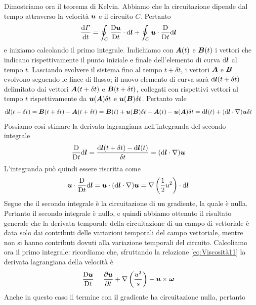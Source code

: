 Dimostriamo ora il teorema di Kelvin. Abbiamo che la circuitazione dipende dal tempo attraverso la velocità $\V{u}$ e il circuito $C$. Pertanto 
\begin{equation}
\der{\Gamma}{t} = \oint_C \derL{\V{u}}{t} \cdot \dd \V{l} + \oint_C \scal{u}{} \derL{}{t} \dd \V{l} \label{eq:Viscosità10}
\end{equation}
e iniziamo calcolando il primo integrale. Indichiamo con $\V{A}(t)$ e $\V{B}(t)$ i vettori che indicano rispettivamente il punto iniziale e finale dell'elemento di curva $\dd \V{l}$ al tempo $t$. Lasciando evolvere il sistema fino al tempo $t+\delta t$, i vettori $\V{A}$ e $\V{B}$ evolvono seguendo le linee di flusso; il nuovo elemento di curva sarà $\dd \V{l}(t+\delta t)$ delimitato dai vettori $\V{A}(t+\delta t)$ e $\V{B}(t+\delta t)$, collegati con rispettivi vettori al tempo $t$ rispettivamente da $\V{u}(\V{A)}\delta t$ e $\V{u}(\V{B})\delta t$. Pertanto vale
\begin{equation}
\dd \V{l} (t+\delta t) = \V{B}(t+\delta t)-\V{A}(t+\delta t) = \V{B}(t) + \V{u}(\V{B})\delta t - \V{A}(t) - \V{u}(\V{A})\delta t = \dd \V{l}(t) + (\dd \scal{l}{\nabla})\V{u} \delta t
\end{equation}
Possiamo così stimare la derivata lagrangiana nell'integranda del secondo integrale
\begin{equation}
\derL{}{t} \dd \V{l} = \dfrac{\dd \V{l} (t+\delta t) - \dd \V{l} (t)}{\delta t} = (\dd \scal{l}{\nabla})\V{u}
\end{equation}
L'integranda può quindi essere riscritta come
\begin{equation}
\scal{u}{} \derL{}{t} \dd \V{l} = \scal{u}{}(\dd \scal{l}{\nabla})\V{u} = \Grad\tonde{\inv{2}u^2}\cdot\dd \V{l}
\end{equation}
Segue che il secondo integrale è la circuitazione di un gradiente, la quale è nulla. Pertanto il secondo integrale è nullo, e quindi abbiamo ottenuto il risultato generale che la derivata temporale della circuitazione di un campo di vettoriale è data solo dai contributi delle variazioni temporali del campo vettoriale, mentre non si hanno contributi dovuti alla variazione temporali del circuito. Calcoliamo ora il primo integrale: ricordiamo che, sfruttando la relazione \ref{eq:Viscosità11} la derivata lagrangiana della velocità è
\begin{equation}
\derL{\V{u}}{t} = \derP{\V{u}}{t} + \Grad\tonde{\dfrac{u^2}{s}} - \vett{u}{\omega}
\end{equation}
Anche in questo caso il termine con il gradiente ha circuitazione nulla, pertanto
